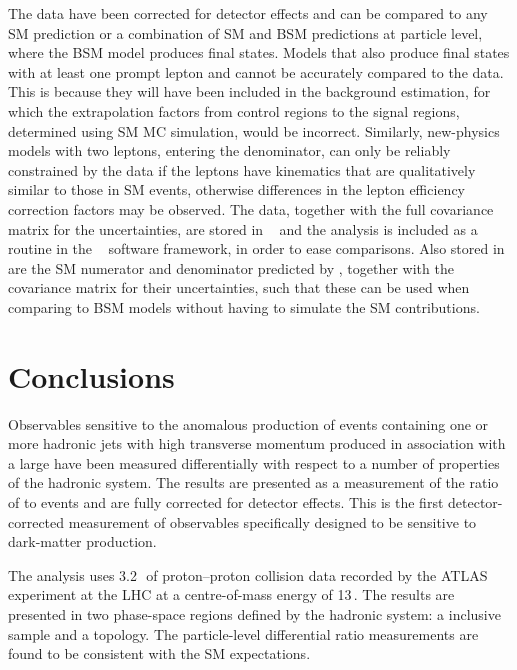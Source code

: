 \documentclass[cernpreprint,txfonts,UKenglish,texlive=2016]{\ATLASLATEXPATH atlasdoc}
\begin{document}
The data have been corrected for detector effects and can be compared
to any SM prediction or a combination of SM and BSM predictions at particle level, where the BSM
model produces \ptmissjet{} final states. 
Models that also produce final states with at least one prompt lepton and
\ptmiss{} cannot be accurately compared to the data. This is because they will have
been included in the \W{} background estimation, for which the
extrapolation factors from control regions to the signal regions, determined
using SM MC simulation, would be incorrect.
Similarly, new-physics models with two leptons, entering the
denominator, can only be reliably constrained by the data if the
leptons have kinematics that are qualitatively similar to those in SM events,
otherwise differences in the lepton efficiency correction factors may
be observed.
The data, together with the full covariance matrix for the uncertainties, are
stored in \hepdata{}~\cite{Buckley:2010jn} and the analysis
is included as a routine in the \rivet~\cite{Buckley:2010ar} software
framework, in
order to ease comparisons. Also stored in \hepdata{} are the SM
numerator and denominator predicted by \sherpa{}, together with the covariance matrix for
their uncertainties, such that these can be used when comparing to BSM
models without having to simulate the SM contributions.

\section{Conclusions}
\label{sec:conclusions}
Observables sensitive to the anomalous production of events containing one or more
hadronic jets with high transverse momentum produced in
association with a large \ptmiss{} have been measured differentially
with respect to a number of properties of the hadronic system.
The results are
presented as a measurement of the ratio of \ptmissjet{} to \lljet{}
events and are fully corrected for detector effects.
This is the first detector-corrected measurement of observables 
specifically designed to be sensitive to dark-matter production.

The analysis uses 3.2\,\ifb\ of proton--proton collision data 
recorded by the ATLAS experiment at the LHC 
at a centre-of-mass energy of 13\,\TeV.
The results are presented in two phase-space regions defined by the hadronic system:
a \onejet{}  inclusive sample and a \vbf{} topology. 
The particle-level differential ratio measurements are found to be
consistent with the SM expectations.
\end{document}
